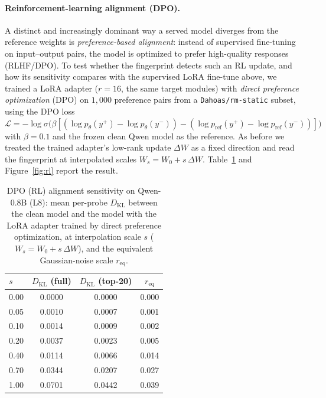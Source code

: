 \documentclass[11pt]{article}
\theoremstyle{definition}
\begin{document}
\paragraph{Reinforcement-learning alignment (DPO).}
A distinct and increasingly dominant way a served model diverges from the
reference weights is \emph{preference-based alignment}: instead of supervised
fine-tuning on input--output pairs, the model is optimized to prefer
high-quality responses (RLHF/DPO). To test whether the fingerprint detects such
an RL update, and how its sensitivity compares with the supervised LoRA
fine-tune above, we trained a LoRA adapter ($r=16$, the same target modules) with
\emph{direct preference optimization} (DPO) on $1{,}000$ preference pairs from a
\texttt{Dahoas/rm-static} subset, using the DPO loss
$\mathcal{L}=-\log\sigma\big(\beta[(\log p_\theta(y^+)-\log p_\theta(y^-))-(\log
p_{\mathrm{ref}}(y^+)-\log p_{\mathrm{ref}}(y^-))]\big)$ with $\beta=0.1$ and the
frozen clean Qwen model as the reference. As before we treated the trained
adapter's low-rank update $\Delta W$ as a fixed direction and read the fingerprint
at interpolated scales $W_s = W_0 + s\,\Delta W$. Table~\ref{tab:rl} and
Figure~\ref{fig:rl} report the result.

\begin{table}[t]
\centering
\small
\caption{DPO (RL) alignment sensitivity on Qwen-0.8B (L8): mean per-probe
$D_{\mathrm{KL}}$ between the clean model and the model with the LoRA adapter
trained by direct preference optimization, at interpolation scale $s$ ($W_s =
W_0 + s\,\Delta W$), and the equivalent Gaussian-noise scale
$r_{\mathrm{eq}}$.}
\label{tab:rl}
\begin{tabular}{lccc}
\toprule
$s$ & $D_{\mathrm{KL}}$ (full) & $D_{\mathrm{KL}}$ (top-20) & $r_{\mathrm{eq}}$ \\
\midrule
0.00 & 0.0000 & 0.0000 & 0.000 \\
0.05 & 0.0010 & 0.0007 & 0.001 \\
0.10 & 0.0014 & 0.0009 & 0.002 \\
0.20 & 0.0037 & 0.0023 & 0.005 \\
0.40 & 0.0114 & 0.0066 & 0.014 \\
0.70 & 0.0344 & 0.0207 & 0.027 \\
1.00 & 0.0701 & 0.0442 & 0.039 \\
\bottomrule
\end{tabular}
\end{table}
\end{document}
